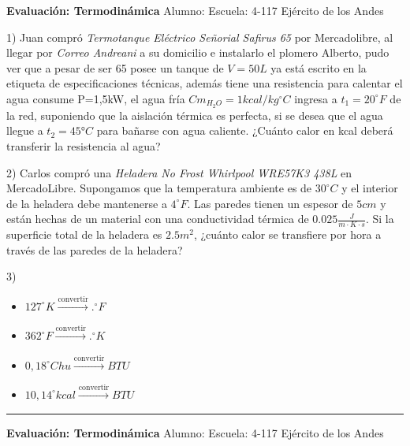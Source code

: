 \documentclass[a4paper,10pt]{article}
\begin{document}
\centerline{\textbf{Evaluación: Termodinámica} \quad Alumno: \underline{\hspace{4cm}} \quad Escuela: 4-117 Ejército de los Andes}

1) Juan compró \emph{Termotanque Eléctrico Señorial Safirus 65} por Mercadolibre, al llegar por \emph{Correo Andreani} a su domicilio e instalarlo el plomero Alberto, pudo ver que a pesar de ser 65 posee un tanque de $V=50L$ ya está escrito en la etiqueta de especificaciones técnicas, además tiene una resistencia para calentar el agua consume P=1,5kW, el agua fría $Cm_{H_2O}=1 kcal/{kg^\circ C}$  ingresa a $t_1=20 ^\circ F$ de la red, suponiendo que la aislación térmica es perfecta, si se desea que el agua llegue a $t_2=45°C$ para bañarse con agua caliente.  ¿Cuánto calor en kcal deberá transferir la resistencia al agua? 
 
 \vspace{0.5cm}

2) Carlos compró una \emph{Heladera No Frost Whirlpool WRE57K3 438L} en MercadoLibre. Supongamos que la temperatura ambiente es de $30^\circ C$ y el interior de la heladera debe mantenerse a $4^\circ F$.  
Las paredes tienen un espesor de $5cm$ y están hechas de un material con una conductividad térmica de $0.025 \frac{J}{m \cdot K \cdot s}$.  
Si la superficie total de la heladera es $2.5 m^2$, ¿cuánto calor se transfiere por hora a través de las paredes de la heladera?
  

\vspace{0.5cm}

3)
\begin{itemize}
    \item $127^\circ K \xrightarrow{\text{convertir}}  .^\circ F $

\item $362^\circ F \xrightarrow{\text{convertir}}  .^\circ K $

\item $0,18^\circ Chu \xrightarrow{\text{convertir}} BTU $

\item $10,14^\circ kcal \xrightarrow{\text{convertir}}  BTU $
 
\end{itemize}
    



\rule{\textwidth}{1pt}    
\centerline{\textbf{Evaluación: Termodinámica} \quad Alumno: \underline{\hspace{4cm}} \quad Escuela: 4-117 Ejército de los Andes}
\end{document}
